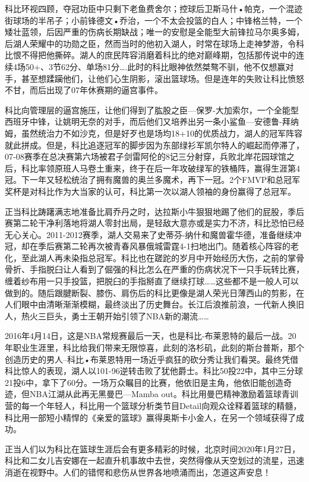 \documentclass[]{book}
\begin{document}
科比环视四顾，夺冠功臣中只剩下老鱼费舍尔；控球后卫斯马什•帕克，一个混迹街球场的半吊子；小前锋德文•乔治，一个不太会投篮的白人；中锋格兰特，一个矮壮蓝领，后因严重的伤病长期缺战；唯一的安慰是全能型大前锋拉马尔奥多姆，后湖人荣耀中的功勋之臣，然而当时的他初入湖人，时常在球场上走神梦游，令科比恨不得把他撕碎。湖人的庶民阵容消磨着科比的绝对巅峰期，包括那传说中的连续4场50+、3节62分、单场81分\ldots{}.此时的科比眼神依然桀骜不驯，他不仅想赢对手，甚至想蹂躏他们，让他们心生阴影，滚出篮球场。但是连年的失败让科比愤怒不甘，而后出现了07年休赛期的逼宫事件。

科比向管理层的逼宫施压，让他们得到了肱股之臣---保罗-大加索尔，一个全能型西班牙中锋，让姚明无奈的对手，而后他们又培养出另一条小鲨鱼---安德鲁-拜纳姆，虽然统治力不如沙克，但是好歹也是场均18+10的优质战力，湖人的冠军阵容就此拼成。但是，科比追逐冠军的脚步因为东部绿衫军凯尔特人的崛起而停滞了，07-08赛季在总决赛第六场被君子剑雷阿伦的8记三分射穿，兵败北岸花园球馆之后，科比率领原班人马卷土重来，终于在后一年攻破绿军的铁桶阵，赢得生涯第4冠。下一年又轻松统治了拥有魔兽的奥兰多魔术，再下一冠。2个FMVP和总冠军奖杯是对科比作为大当家的认可，科比第一次以湖人领袖的身份赢得了总冠军。

正当科比踌躇满志地准备比肩乔丹之时，达拉斯小牛狠狠地踢了他们的屁股，季后赛第二轮干净利落地将湖人零封出局，是轻敌大意亦或是实力不济，科比恐怕已经无心关心。2011-2012赛季，湖人交易来了史蒂芬-纳什和魔兽霍华德，准备继续冲冠，却在季后赛第二轮再次被青春风暴俄城雷霆4-1扫地出门。随着核心阵容的老化，至此湖人再未染指总冠军。科比也在蹉跎的岁月中开始经历大伤，之前的掌骨骨折、手指脱臼让人看到了倔强的科比怎么在严重的伤病状况下一只手玩转比赛，缠着纱布用一只手投篮，把脱臼的手指掰直了继续打球\ldots{}\ldots{}这些都不是一般人可以做到的。随后跟腱断裂、膝伤、肩伤后的科比更像是湖人荣光日薄西山的剪影，在人们眼中由清晰渐渐模糊，最终淡出了历史舞台。长江后浪推前浪，一代新人换旧人，热火三巨头，勇士王朝开始引领了NBA新的潮流\ldots{}\ldots{}

2016年4月14日，这是NBA常规赛最后一天，也是科比-布莱恩特的最后一战。20年职业生涯里，科比给我们带来无限惊喜，此刻的洛杉矶，此刻的斯台普斯，那个创造历史的男人--科比•布莱恩特用一场近乎疯狂的砍分秀让我们看哭。最终凭借科比惊人的表现，湖人以101-96逆转击败了犹他爵士。科比50投22中，其中三分球21投6中，拿下了60分。一场万众瞩目的比赛，他依旧是主角，他依旧能创造奇迹，但NBA江湖从此再无黑曼巴---Mamba out。科比用曼巴精神激励着篮球青训营的每一个年轻人，科比用一个篮球分析类节目Detail向观众诠释着篮球的精髓，科比用一部短小精悍的《亲爱的篮球》赢得奥斯卡小金人，在另一个领域获得了成功。

正当人们以为科比在篮球生涯后会有更多精彩的时候，北京时间2020年1月27日，科比和二女儿吉安娜在一起直升机事故中去世，突然得像从天空划过的流星，迅速消逝在视野中。人们的错愕和悲伤从世界各地喷涌而出，怎道这声安息！
\end{document}
